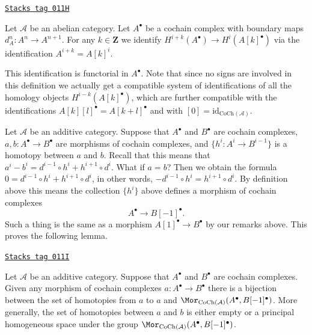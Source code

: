 \begin{definition}
\label{homology-definition-cohomology-shift}
\href{https://stacks.math.columbia.edu/tag/011H}{\texttt{Stacks tag 011H}}

Let $\mathcal{A}$ be an abelian category.
Let $A^\bullet$ be a cochain complex
with boundary maps $d_A^n : A^n \to A^{n + 1}$.
For any $k \in \mathbf{Z}$ we identify
{\it $H^{i + k}(A^\bullet) \longrightarrow H^i(A[k]^\bullet)$}
via the identification $A^{i + k} = A[k]^i$.
\end{definition}

This identification is functorial in $A^\bullet$.
Note that since no signs are involved in this
definition we actually get a compatible system
of identifications of all the homology
objects $H^{i - k}(A[k]^\bullet)$, which are
further compatible with the identifications
$A[k][l]^\bullet = A[k + l]^\bullet$ and
with $[0] = \text{id}_{\text{CoCh}(\mathcal{A})}$.

\medskip\noindent
Let $\mathcal{A}$ be an additive category.
Suppose that $A^\bullet$ and $B^\bullet$ are
cochain complexes, $a, b : A^\bullet \to B^\bullet$ are
morphisms of cochain complexes, and $\{h^i : A^i \to B^{i - 1}\}$
is a homotopy between $a$ and $b$. Recall that this means
that
$a^i - b^i = d^{i - 1} \circ h^i + h^{i + 1} \circ d^i$.
What if $a = b$? Then we obtain the formula
$0 = d^{i - 1} \circ h^i + h^{i + 1} \circ d^i$,
in other words, $ - d^{i - 1} \circ h^i = h^{i + 1} \circ d^i$.
By definition above this means the collection $\{h^i\}$
above defines a morphism of cochain complexes
$$
A^\bullet \longrightarrow B[-1]^\bullet.
$$
Such a thing is the same as a morphism $A[1]^\bullet \to B^\bullet$
by our remarks above. This proves the following lemma.

\begin{lemma}
\label{homology-lemma-homotopy-shift-cochain}
\href{https://stacks.math.columbia.edu/tag/011I}{\texttt{Stacks tag 011I}}

Let $\mathcal{A}$ be an additive category.
Suppose that $A^\bullet$ and $B^\bullet$ are
cochain complexes. Given any morphism of cochain
complexes $a : A^\bullet \to B^\bullet$ there
is a bijection between the set of homotopies
from $a$ to $a$ and
$\Mor_{\text{CoCh}(\mathcal{A})}(A^\bullet, B[-1]^\bullet)$.
More generally, the set of homotopies between
$a$ and $b$ is either empty or a principal homogeneous
space under the group
$\Mor_{\text{CoCh}(\mathcal{A})}(A^\bullet, B[-1]^\bullet)$.
\end{lemma}

